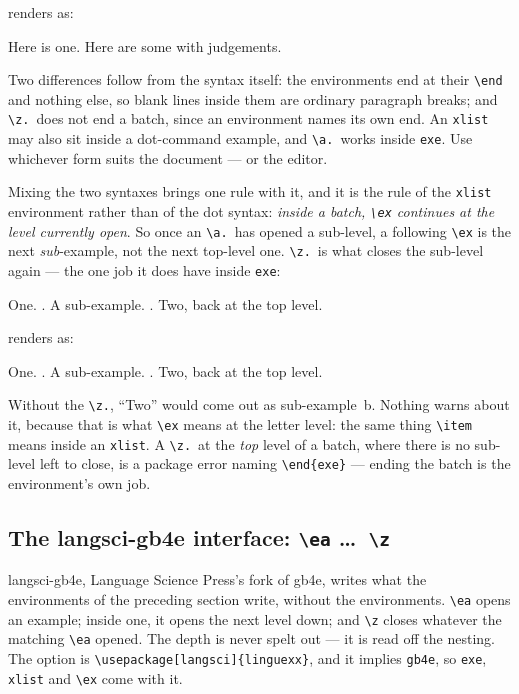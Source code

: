 \documentclass[11pt,a4paper]{article}
\newcommand{\cs}[1]{\texttt{\textbackslash #1}}
\newcommand{\pkg}[2][]{\textsf{#2}}
\newcommand{\opt}[1]{\texttt{#1}}
\newcommand{\rendered}{\par\medskip\noindent\textcolor{gray!70}{\small renders as:}\par\nobreak\smallskip}
\newcommand{\afterex}{\par\addvspace{\medskipamount}}
\begin{document}
\rendered
\begin{exe}
\ex\label{gbdoc} Here is one.
\ex Here are some with judgements.
 \begin{xlist}
 \end{xlist}
\end{exe}

\afterex
Two differences follow from the syntax itself: the environments end at
their \cs{end} and nothing else, so blank lines inside them are ordinary
paragraph breaks; and \cs{z.}\ does not end a batch, since an environment
names its own end. An \texttt{xlist} may also sit inside a dot-command
example, and \cs{a.}\ works inside \texttt{exe}. Use whichever form
suits the document --- or the editor.

Mixing the two syntaxes brings one rule with it, and it is the rule of
the \texttt{xlist} environment rather than of the dot syntax:
\emph{inside a batch, \cs{ex} continues at the level currently open}. So
once an \cs{a.}\ has opened a sub-level, a following \cs{ex} is the next
\emph{sub}-example, not the next top-level one. \cs{z.}\ is what closes
the sub-level again --- the one job it does have inside \texttt{exe}:

\begin{code}
\begin{exe}
\ex One.
\a. A sub-example.
\z.
\ex Two, back at the top level.
\end{exe}
\end{code}

\rendered
\begin{exe}
\ex One.
\a. A sub-example.
\z.
\ex Two, back at the top level.
\end{exe}

\afterex
Without the \cs{z.}, ``Two'' would come out as sub-example~b. Nothing
warns about it, because that is what \cs{ex} means at the letter level:
the same thing \cs{item} means inside an \texttt{xlist}. A \cs{z.}\ at
the \emph{top} level of a batch, where there is no sub-level left to
close, is a package error naming \cs{end\{exe\}} --- ending the batch is
the environment's own job.

\subsection{The \pkg{langsci-gb4e} interface: \cs{ea} \dots\ \cs{z}}
\label{sec:langsci}

\pkg{langsci-gb4e}, Language Science Press's fork of \pkg{gb4e}, writes
what the environments of the preceding section write, without the
environments. \cs{ea} opens an example; inside one, it opens the next
level down; and \cs{z} closes whatever the matching \cs{ea} opened. The
depth is never spelt out --- it is read off the nesting. The option is
\cs{usepackage[langsci]\{linguexx\}}, and it implies \opt{gb4e}, so
\texttt{exe}, \texttt{xlist} and \cs{ex} come with it.
\end{document}
